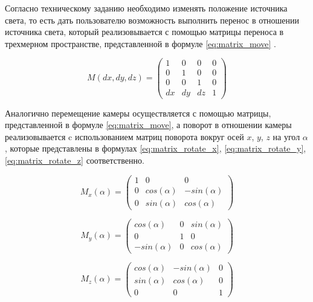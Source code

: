 


Согласно техническому заданию необходимо изменять положение источника света, то есть дать пользователю возможность выполнить перенос в отношении источника света, который реализовывается с помощью матрицы переноса в трехмерном пространстве, представленной в формуле \ref{eq:matrix_move} \cite{куров}.

\begin{equation}\label{eq:matrix_move}
	M(dx, dy, dz) = \begin{pmatrix}
		1 & 0 & 0 & 0 \\
		0 & 1 & 0 & 0 \\
		0 & 0 & 1 & 0 \\
		dx & dy & dz & 1
	\end{pmatrix}
\end{equation}

Аналогично перемещение камеры осуществляется с помощью матрицы, представленной в формуле \ref{eq:matrix_move}, а поворот в отношении камеры реализовывается c использованием матриц поворота вокруг осей $x$, $y$, $z$ на угол $\alpha$, которые представлены в формулах \ref{eq:matrix_rotate_x}, \ref{eq:matrix_rotate_y}, \ref{eq:matrix_rotate_z} соответственно.

\begin{equation}\label{eq:matrix_rotate_x}
	M_x(\alpha) = \begin{pmatrix}
		1 & 0 & 0 \\
		0 & cos(\alpha) & -sin(\alpha) \\
		0 & sin(\alpha) & cos(\alpha)
	\end{pmatrix}
\end{equation}

\begin{equation}\label{eq:matrix_rotate_y}
	M_y(\alpha) = \begin{pmatrix}
		cos(\alpha) & 0 & sin(\alpha) \\
		0 & 1 & 0 \\
		-sin(\alpha) & 0 & cos(\alpha)
	\end{pmatrix}
\end{equation}

\begin{equation}\label{eq:matrix_rotate_z}
	M_z(\alpha) = \begin{pmatrix}
		cos(\alpha) & -sin(\alpha) & 0 \\
		sin(\alpha) & cos(\alpha) & 0 \\
		0 & 0 & 1
	\end{pmatrix}
\end{equation}